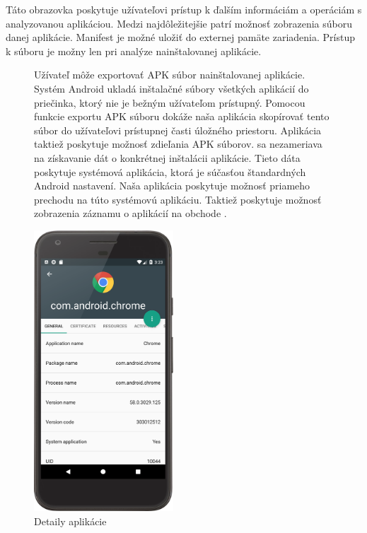 Táto obrazovka poskytuje užívateľovi prístup k ďalším informáciám a operáciám s analyzovanou aplikáciou. Medzi najdôležitejšie patrí možnosť zobrazenia súboru  danej aplikácie. Manifest je možné uložiť do externej pamäte zariadenia. Prístup k súboru  je možny len pri analýze nainštalovanej aplikácie.
\begin{figure}[H]
\begin{minipage}[t]{0.48\textwidth}
Užívateľ môže exportovať APK súbor nainštalovanej aplikácie. Systém Android ukladá inštalačné súbory všetkých aplikácií do priečinka, ktorý nie je bežným užívateľom prístupný. Pomocou funkcie exportu APK súboru dokáže naša aplikácia skopírovať tento súbor do užívateľovi prístupnej časti úložného priestoru. Aplikácia taktiež poskytuje možnosť zdieľania APK súborov. 
 sa nezameriava na získavanie dát o konkrétnej inštalácii aplikácie. Tieto dáta poskytuje systémová aplikácia, ktorá je súčasťou štandardných Android nastavení. Naša aplikácia poskytuje možnosť priameho prechodu na túto systémovú aplikáciu.  Taktiež poskytuje možnosť zobrazenia záznamu o aplikácií na obchode .
\end{minipage}%
\hfill
\centering
\begin{minipage}[t][][b]{0.45\textwidth}
\centering
    \includegraphics[width=5.2cm]{images/app/detail_device.png}
\centering
\caption{Detaily aplikácie}
\label{fig:app-detail}
\end{minipage}%
\end{figure}

